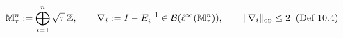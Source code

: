 \documentclass[preview]{standalone}
\begin{document}
\begin{align*}
\special{dvisvgm:raw <g id='unique000'>}\mathbb{M}_\tau^n := \bigoplus_{i=1}^n \sqrt{\tau}\,\mathbb{Z}, \qquad \nabla_i := I - E_i^{-1} \in \mathcal{B}(\ell^\infty(\mathbb{M}_\tau^n)), \qquad \|\nabla_i\|_{\mathrm{op}} \le 2\;\;(\text{Def 10.4})\special{dvisvgm:raw </g>}
\end{align*}
\end{document}
